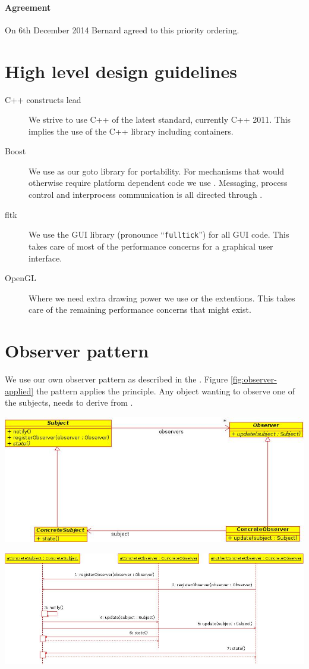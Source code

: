 \paragraph{Agreement} On 6th December 2014 Bernard agreed to this priority ordering. 

\section{High level design guidelines}

\begin{description}

	\item[C++ constructs lead] We strive to use C++ of the latest standard, currently C++ 2011.
	This implies the use of the C++ library including containers.
	
	\item[Boost] We use \boost as our goto library for portability. For mechanisms that would
	otherwise require platform dependent code we use \boost. Messaging, process control and
	interprocess communication is all directed through \boost.
	
	\item[fltk] We use the GUI library \fltk (pronounce ``\texttt{fulltick}'') for all GUI code.
	This takes care of most of the performance concerns for a graphical user interface.
	
	\item[OpenGL] Where we need extra drawing power we use \opengl or the \fltk {} extentions.
	This takes care of the remaining performance concerns that might exist.
	
\end{description}

\section{Observer pattern}

We use our own observer pattern as described in the . 
Figure \ref{fig:observer-applied} the pattern applies the principle. 
Any object wanting to observe one of the subjects, needs to 
derive from .

\begin{center}
	\includegraphics[width=.7\linewidth]{ObserverClassDiagram.jpeg}
	\label{fig:observer-pattern}
\end{center}

\begin{center}
	\includegraphics[width=.7\linewidth]{ObserverSequenceDiagram.jpeg}
	\label{fig:observer-applied}
\end{center}

